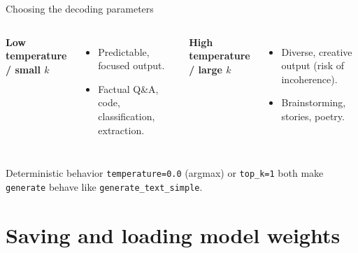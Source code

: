 \documentclass[aspectratio=169]{beamer}
\begin{document}
	\begin{frame}{Choosing the decoding parameters}
		\begin{columns}[T]
			\textbf{Low temperature / small $k$}
			\begin{itemize}
				\item Predictable, focused output.
				\item Factual Q\&A, code, classification, extraction.
			\end{itemize}
			\textbf{High temperature / large $k$}
			\begin{itemize}
				\item Diverse, creative output (risk of incoherence).
				\item Brainstorming, stories, poetry.
			\end{itemize}
		\end{columns}
		\vspace{0.4cm}
		\begin{block}{Deterministic behavior}
			\small \texttt{temperature=0.0} (argmax) or \texttt{top\_k=1} both make \texttt{generate} behave like \texttt{generate\_text\_simple}.
		\end{block}
	\end{frame}


	\section{Saving and loading model weights}
\end{document}
